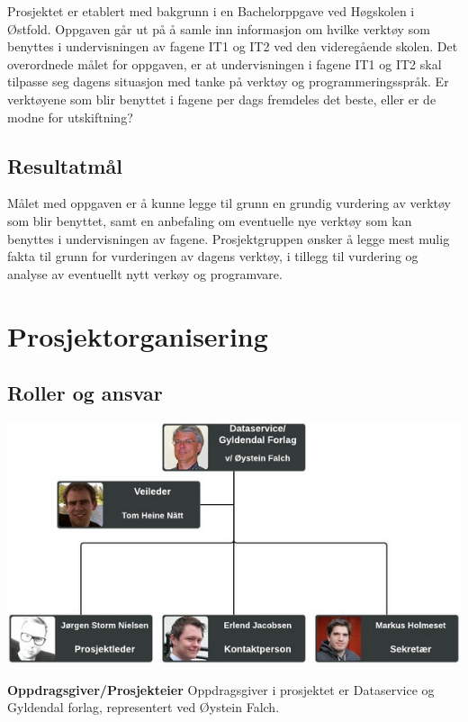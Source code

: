 \documentclass[norsk,a4paper,12pt]{article}
\begin{document}
Prosjektet er etablert med bakgrunn i en Bachelorppgave ved Høgskolen i Østfold. Oppgaven går ut på å samle inn informasjon om hvilke verktøy som benyttes i undervisningen av fagene IT1 og IT2 ved den videregående skolen. Det overordnede målet for oppgaven, er at undervisningen i fagene IT1 og IT2 skal tilpasse seg dagens situasjon med tanke på verktøy og programmeringsspråk. Er verktøyene som blir benyttet i fagene per dags fremdeles det beste, eller er de modne for utskiftning? 

\subsection{Resultatmål}

Målet med oppgaven er å kunne legge til grunn en grundig vurdering av verktøy som blir benyttet, samt en anbefaling om eventuelle nye verktøy som kan benyttes i undervisningen av fagene. Prosjektgruppen ønsker å legge mest mulig fakta til grunn for vurderingen av dagens verktøy, i tillegg til vurdering og analyse av eventuellt nytt verkøy og programvare.

\section{Prosjektorganisering}

\subsection{Roller og ansvar}

\includegraphics{prorg.png}

\noindent\textbf{Oppdragsgiver/Prosjekteier}\newline
Oppdragsgiver i prosjektet er Dataservice og Gyldendal forlag, representert ved Øystein Falch.
\newline
\end{document}
